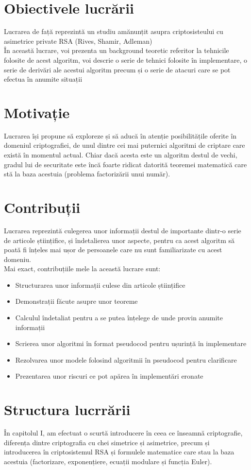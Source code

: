 \documentclass[12pt, oneside]{book}
\begin{document}
\section{Obiectivele lucrării}
Lucrarea de față reprezintă un studiu amănunțit asupra criptosisteului cu asimetrice private RSA (Rives, Shamir, Adleman) \\
În această lucrare, voi prezenta un background teoretic referitor la tehnicile folosite de acest algoritm, voi descrie o serie de tehnici folosite în implementare, o serie de derivări ale acestui algoritm precum și o serie de atacuri care se pot efectua în anumite situații
\section{Motivație}
Lucrarea își propune să exploreze și să aducă în atenție posibilitățile oferite în domeniul criptografiei, de unul dintre cei mai puternici algoritmi de criptare care există în momentul actual. Chiar dacă acesta este un algoritm destul de vechi, gradul lui de securitate este încă foarte ridicat datorită teoremei matematică care stă la baza acestuia (problema factorizării unui număr).
\section{Contribuții}
Lucrarea reprezintă culegerea unor informații destul de importante dintr-o serie de articole științifice, și îndetalierea unor aspecte, pentru ca acest algoritm să poată fi înțeles mai ușor de persoanele care nu sunt familiarizate cu acest domeniu.\\
Mai exact, contribuțiile mele la această lucrare sunt:
\begin{itemize}
\item Structurarea unor informații culese din articole științifice
\item Demonstrații făcute asupre unor teoreme
\item Calculul îndetaliat pentru a se putea înțelege de unde provin anumite informații
\item Scrierea unor algoritmi în format pseudocod pentru ușurință în implementare
\item Rezolvarea unor modele folosind algoritmii în pseudocod pentru clarificare
\item Prezentarea unor riscuri ce pot apărea în implementări eronate
\end{itemize} 
\section{Structura lucrrării}
În capitolul I, am efectuat o scurtă introducere în ceea ce înseamnă criptografie, diferența dintre criptografia cu chei simetrice și asimetrice, precum și introducerea în criptosistemul RSA și formulele matematice care stau la baza acestuia (factorizare, exponențiere, ecuații modulare și funcția Euler).
\end{document}

